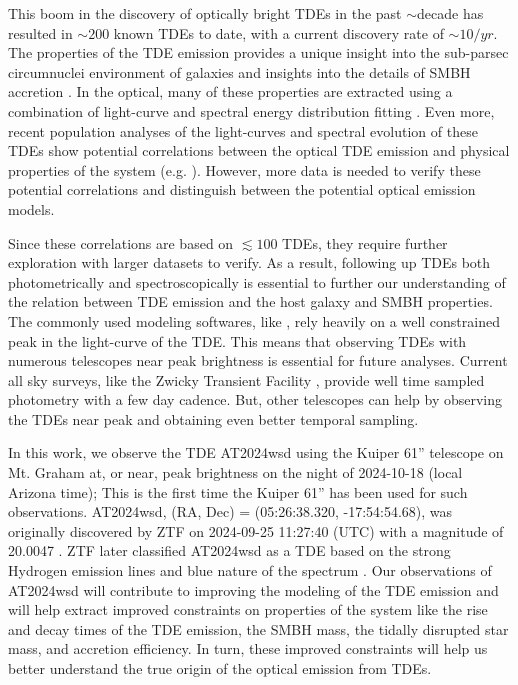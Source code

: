 \documentclass{aastex631}
\begin{document}
This boom in the discovery of optically bright TDEs in the past $\sim$decade has resulted in $\sim200$ known TDEs to date, with a current discovery rate of $\sim10/yr$. The properties of the TDE emission provides a unique insight into the sub-parsec circumnuclei environment of galaxies and insights into the details of SMBH accretion \citep{holoien2020,Newsome2024}. In the optical, many of these properties are extracted using a combination of light-curve and spectral energy distribution fitting \citep{Mockler2019}. Even more, recent population analyses of the light-curves and spectral evolution of these TDEs show potential correlations between the optical TDE emission and physical properties of the system (e.g. \citet{vanVelzen2021}). However, more data is needed to verify these potential correlations and distinguish between the potential optical emission models.

Since these correlations are based on $\lesssim 100$ TDEs, they require further exploration with larger datasets to verify. As a result, following up TDEs both photometrically and spectroscopically is essential to further our understanding of the relation between TDE emission and the host galaxy and SMBH properties. The commonly used modeling softwares, like \citet{Mockler2019}, rely heavily on a well constrained peak in the light-curve of the TDE. This means that observing TDEs with numerous telescopes near peak brightness is essential for future analyses. Current all sky surveys, like the Zwicky Transient Facility \citep[ZTF]{ZTF}, provide well time sampled photometry with a few day cadence. But, other telescopes can help by observing the TDEs near peak and obtaining even better temporal sampling.

In this work, we observe the TDE AT2024wsd using the Kuiper 61'' telescope on Mt. Graham at, or near, peak brightness on the night of 2024-10-18 (local Arizona time); This is the first time the Kuiper 61'' has been used for such observations. AT2024wsd, (RA, Dec) = (05:26:38.320, -17:54:54.68), was originally discovered by ZTF on 2024-09-25 11:27:40 (UTC) with a magnitude of 20.0047 \citep{at2024wsd_discovery}. ZTF later classified AT2024wsd as a TDE based on the strong Hydrogen emission lines and blue nature of the spectrum \citep{at2024wsd_classification}. Our observations of AT2024wsd will contribute to improving the modeling of the TDE emission and will help extract improved constraints on properties of the system like the rise and decay times of the TDE emission, the SMBH mass, the tidally disrupted star mass, and accretion efficiency. In turn, these improved constraints will help us better understand the true origin of the optical emission from TDEs.
\end{document}
